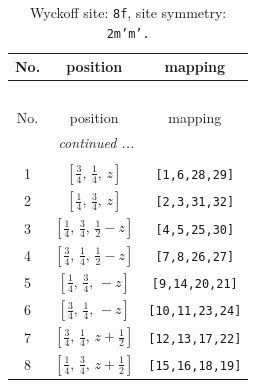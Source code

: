 \documentclass[fleqn,8pt]{jsarticle}
\begin{document}
\begin{longtable}{ccc}
\caption{Wyckoff site: {\tt 8f}, site symmetry: {\tt 2m'm'.}}
 \\
 \hline \hline
No. & position & mapping \\ \hline \endfirsthead

\multicolumn{2}{l}{\tablename\ \thetable{}} \\
 \hline \hline
No. & position & mapping \\ \hline \endhead

 \hline \hline
\multicolumn{2}{r}{\footnotesize\it continued ...} \\ \endfoot

 \hline \hline
\multicolumn{2}{r}{} \\ \endlastfoot

1 & $\left[ \frac{3}{4},\, \frac{1}{4},\, z \right]$ & {\tt [1,6,28,29]} \\ \hline
2 & $\left[ \frac{1}{4},\, \frac{3}{4},\, z \right]$ & {\tt [2,3,31,32]} \\ \hline
3 & $\left[ \frac{1}{4},\, \frac{3}{4},\, \frac{1}{2} - z \right]$ & {\tt [4,5,25,30]} \\ \hline
4 & $\left[ \frac{3}{4},\, \frac{1}{4},\, \frac{1}{2} - z \right]$ & {\tt [7,8,26,27]} \\ \hline
5 & $\left[ \frac{1}{4},\, \frac{3}{4},\, - z \right]$ & {\tt [9,14,20,21]} \\ \hline
6 & $\left[ \frac{3}{4},\, \frac{1}{4},\, - z \right]$ & {\tt [10,11,23,24]} \\ \hline
7 & $\left[ \frac{3}{4},\, \frac{1}{4},\, z + \frac{1}{2} \right]$ & {\tt [12,13,17,22]} \\ \hline
8 & $\left[ \frac{1}{4},\, \frac{3}{4},\, z + \frac{1}{2} \right]$ & {\tt [15,16,18,19]} \\
\end{longtable}
\renewcommand{\arraystretch}{1.2}
\end{document}
